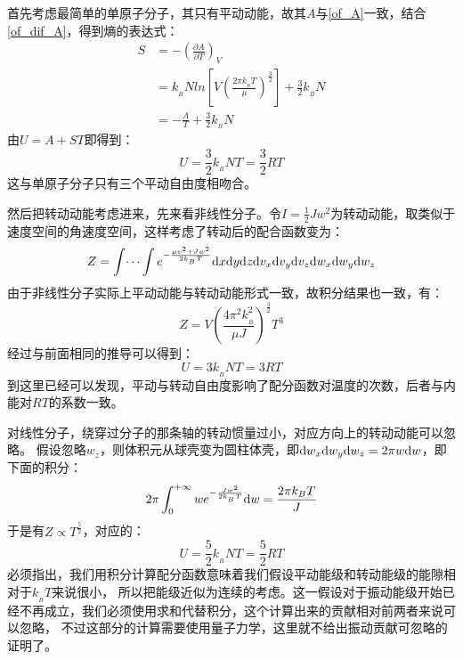 \documentclass{Physics_H_Notes}
\begin{document}
        \begin{prove}
            首先考虑最简单的单原子分子，其只有平动动能，故其$A$与\ref{of_A}一致，结合\ref{of_dif_A}，得到熵的表达式：
            \begin{equation}
                \begin{aligned}
                    S &= -\left(\frac{\partial A}{\partial T}\right)_{V} \\
                      &= k_{_B}Nln\left[V\left(\frac{2\pi k_{_B}T}{\mu}\right)^{\frac{3}{2}}\right]+\frac{3}{2}k_{_B}N\\
                      &= -\frac{A}{T} +\frac{3}{2}k_{_B}N
                \end{aligned}
            \end{equation}
            由$U=A+ST$即得到：
            \begin{equation}
                U = \frac{3}{2}k_{_B}NT = \frac{3}{2}RT
            \end{equation}
            这与单原子分子只有三个平动自由度相吻合。
            
            然后把转动动能考虑进来，先来看非线性分子。令$I=\frac{1}{2}Jw^{2}$为转动动能，取类似于速度空间的角速度空间，这样考虑了转动后的配合函数变为：
            \begin{equation}
                Z =\int \dots \int e^{-\frac{\mu v^{2}+J w^{2}}{2k_{_B}T}} \mathrm{d}{x}\mathrm{d}{y}\mathrm{d}{z}\mathrm{d}{v_x}\mathrm{d}{v_y}\mathrm{d}{v_z}\mathrm{d}{w_x}\mathrm{d}{w_y}\mathrm{d}{w_z}
            \end{equation}
            由于非线性分子实际上平动动能与转动动能形式一致，故积分结果也一致，有：
            \begin{equation}
                Z =  V\left(\frac{4\pi^{2} k_{_B}^{2}}{\mu J}\right)^{\frac{3}{2}} T^{3}
            \end{equation}
            经过与前面相同的推导可以得到：
            \begin{equation}
                U = 3k_{_B}NT = 3RT
            \end{equation}
            到这里已经可以发现，平动与转动自由度影响了配分函数对温度的次数，后者与内能对$RT$的系数一致。

            对线性分子，绕穿过分子的那条轴的转动惯量过小，对应方向上的转动动能可以忽略。
            假设忽略$w_z$，则体积元从球壳变为圆柱体壳，即$\mathrm{d}{w_x}\mathrm{d}{w_y}\mathrm{d}{w_z}=2\pi w\mathrm{d}{w}$，即下面的积分：
            \begin{equation}
                2\pi \int_{0}^{+\infty} we^{-\frac{J w^{2}}{2k_{_B}T}}\mathrm{d}{w} = \frac{2\pi k_{B}T}{J}
            \end{equation}
            于是有$Z\propto T^{\frac{5}{2}}$，对应的：
            \begin{equation}
                U = \frac{5}{2}k_{_B}NT = \frac{5}{2}RT
            \end{equation}
            必须指出，我们用积分计算配分函数意味着我们假设平动能级和转动能级的能隙相对于$k_{_B}T$来说很小，
            所以把能级近似为连续的考虑。这一假设对于振动能级开始已经不再成立，我们必须使用求和代替积分，这个计算出来的贡献相对前两者来说可以忽略，
            不过这部分的计算需要使用量子力学，这里就不给出振动贡献可忽略的证明了。
        \end{prove}
        
\end{document}

